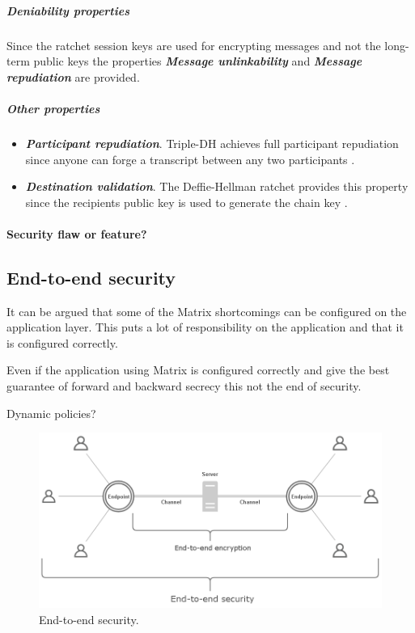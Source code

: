 \subparagraph{Deniability properties}

Since the ratchet session keys are used for encrypting messages and not the long-term public keys the properties \textbf{\emph{Message unlinkability}} and \textbf{\emph{Message repudiation}} are provided. 


\subparagraph{Other properties}

\begin{itemize}
	\item \textbf{\emph{Participant repudiation}}. Triple-DH achieves full participant repudiation since anyone can forge a transcript between any two participants \cite{sok}.
	\item \textbf{\emph{Destination validation}}. The Deffie-Hellman ratchet provides this property since the recipients public key is used to generate the chain key \cite{sok}. %
\end{itemize}


\paragraph{Security flaw or feature?}


\subsection{End-to-end security}
It can be argued that some of the Matrix shortcomings can be configured on the application layer. This puts a lot of responsibility on the application and that it is configured correctly. 

Even if the application using Matrix is configured correctly and give the best guarantee of forward and backward secrecy this not the end of security. 

Dynamic policies?


\begin{figure}[H]
	\centering
	\includegraphics[width=12cm]{figures/e2esecurity.png}
	\caption{End-to-end security.}
	\label{fig:e2esecurity}
\end{figure}


